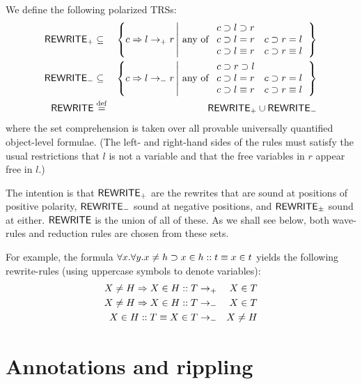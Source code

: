 \begin{defn}[$\Rewrite$]
We define the following polarized TRSs:
\begin{eqnarray*}
  {\sf REWRITE}_+ &\subseteq& \left\{ c\Rightarrow l\rightarrow_+ r \left|
			\mbox{\ any of\ }\begin{array}{ll}
			c\supset l\supset r\\
			c\supset l=r & c\supset r=l\\
			c\supset l\equiv r & c\supset r\equiv l
			\end{array}\right.\right\}\\
  {\sf REWRITE}_- &\subseteq& \left\{ c\Rightarrow l\rightarrow_- r \left|
			\mbox{\ any of\ }\begin{array}{ll}
			c\supset r\supset l\\
			c\supset l=r & c\supset r=l\\
			c\supset l\equiv r & c\supset r\equiv l
			\end{array}\right.\right\}\\
  {\sf REWRITE} & \stackrel{{\rm def}}{=} &  {{\sf REWRITE}_+} \cup {{\sf REWRITE}_-}
\end{eqnarray*}
where the set comprehension is taken over all provable universally
quantified object-level
formulae. (The left- and right-hand sides of the rules must satisfy the 
usual restrictions that $l$ is not a variable and that the free
variables in $r$ appear free in $l$.)
\end{defn}
The intention is that ${\sf REWRITE}_+$ are the rewrites that are sound at
positions of positive polarity, ${\sf REWRITE}_-$ sound at negative
positions, and ${\sf REWRITE}_\pm$ sound at either. $\Rewrite$ is the union 
of all of these.  As we shall see below, both wave-rules and reduction 
rules are chosen from these sets.

For example, the formula $\forall x.\forall y. x\not=h\supset x\in
h::t\equiv x\in t$ yields the following rewrite-rules (using
uppercase symbols to denote variables):
\begin{eqnarray*}
X\not=H \Rightarrow X\in H::T &\rightarrow_+ & X\in T\\
X\not=H \Rightarrow X\in H::T &\rightarrow_- & X\in T\\
                  X\in H::T\equiv X\in T &\rightarrow_- & X\not=H\\
\end{eqnarray*}

\section {Annotations and rippling}
\label{sec:annotation}

